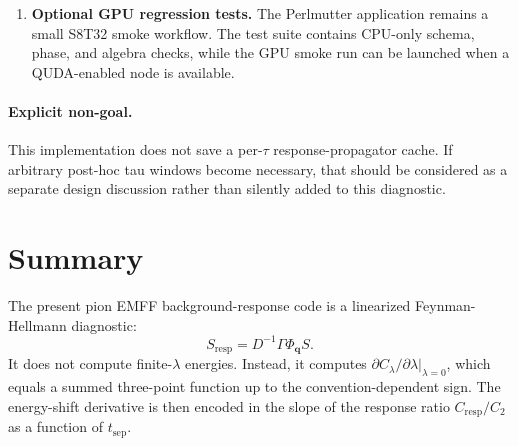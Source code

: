 \documentclass[11pt,a4paper]{article}
\newcommand{\Dslash}{D}
\newcommand{\Sresp}{S_{\mathrm{resp}}}
\newcommand{\Ctwo}{C_2}
\newcommand{\Cresp}{C_{\mathrm{resp}}}
\begin{document}
\begin{enumerate}[label=\arabic*.]
  \item \textbf{Optional GPU regression tests.}
  The Perlmutter application remains a small S8T32 smoke workflow.  The test
  suite contains CPU-only schema, phase, and algebra checks, while the GPU
  smoke run can be launched when a QUDA-enabled node is available.
\end{enumerate}

\paragraph{Explicit non-goal.}
This implementation does not save a per-\(\tau\) response-propagator cache.
If arbitrary post-hoc tau windows become necessary, that should be considered
as a separate design discussion rather than silently added to this diagnostic.

\section{Summary}

The present pion EMFF background-response code is a linearized
Feynman-Hellmann diagnostic:
\begin{equation}
  \Sresp=\Dslash^{-1}\Gamma\Phi_{\mathbf q}S.
\end{equation}
It does not compute finite-\(\lambda\) energies.  Instead, it computes
\(\partial C_\lambda/\partial\lambda|_{\lambda=0}\), which equals a summed
three-point function up to the convention-dependent sign.  The energy-shift
derivative is then encoded in the slope of the response ratio
\(\Cresp/\Ctwo\) as a function of \(t_{\mathrm{sep}}\).
\end{document}
